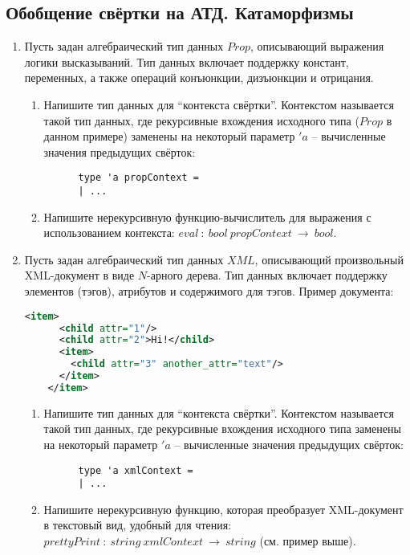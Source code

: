 \documentclass[a4paper,11pt]{article}
\begin{document}
\subsection*{Обобщение свёртки на АТД. Катаморфизмы}
\begin{enumerate}
\item Пусть задан алгебраический тип данных $Prop$, описывающий выражения логики
  высказываний. Тип данных включает поддержку констант, переменных, а также
  операций конъюнкции, дизъюнкции и отрицания.
  \begin{enumerate}
  \item Напишите тип данных для ``контекста свёртки''. Контекстом называется
    такой тип данных, где рекурсивные вхождения исходного типа ($Prop$ в данном
    примере) заменены на некоторый параметр $'\!a$ -- вычисленные значения
    предыдущих свёрток:
    \begin{lstlisting}
      type 'a propContext =
      | ...
    \end{lstlisting}
  \item Напишите нерекурсивную функцию-вычислитель для выражения с 
    использованием контекста: $eval~:~bool~propContext~\rightarrow~bool$.
  \end{enumerate}

\item Пусть задан алгебраический тип данных $XML$, описывающий произвольный 
  XML-документ в виде $N$-арного дерева. Тип данных включает поддержку 
  элементов (тэгов), атрибутов и содержимого для тэгов. Пример документа:
  \begin{lstlisting}[language=XML]
    <item>
      <child attr="1"/>
      <child attr="2">Hi!</child>
      <item>
        <child attr="3" another_attr="text"/>
      </item>
    </item>
  \end{lstlisting}
  \begin{enumerate}
  \item Напишите тип данных для ``контекста свёртки''. Контекстом называется
    такой тип данных, где рекурсивные вхождения исходного типа заменены на
    некоторый параметр $'\!a$ -- вычисленные значения предыдущих свёрток:
    \begin{lstlisting}
      type 'a xmlContext =
      | ...
    \end{lstlisting}
  \item Напишите нерекурсивную функцию, которая преобразует XML-документ
    в текстовый вид, удобный для чтения: $prettyPrint~:~string~xmlContext~
    \rightarrow~string$ (см. пример выше).
  \end{enumerate}
\end{enumerate}
\end{document}
